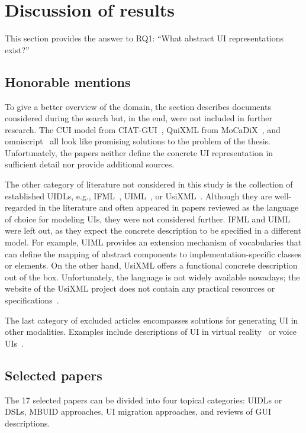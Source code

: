 \section{Discussion of results}\label{sec:review-discussion-of-results}

This section provides the answer to RQ1: \enquote{What abstract UI representations exist?}
\subsection{Honorable mentions}\label{subsec:honorable-mentions}
To give a better overview of the domain, the section describes documents considered during the search but, in the end, were not included in further research.
The CUI model from CIAT-GUI~\cite{Molina2012-my}, QuiXML from MoCaDiX~\cite{Vanderdonckt2019-av}, and omniscript~\cite{Ulusoy2019-jh} all look like promising solutions to the problem of the thesis.
Unfortunately, the papers neither define the concrete UI representation in sufficient detail nor provide additional sources.

The other category of literature not considered in this study is the collection of established UIDLs, e.g., IFML~\cite{Brambilla2014-ln}, UIML~\cite{Abrams1999}, or UsiXML~\cite{Limbourg2005}.
Although they are well-regarded in the literature and often appeared in papers reviewed as the language of choice for modeling UIs, they were not considered further.
IFML and UIML were left out, as they expect the concrete description to be specified in a different model.
For example, UIML provides an extension mechanism of vocabularies that can define the mapping of abstract components to implementation-specific classes or elements.
On the other hand, UsiXML offers a functional concrete description out of the box.
Unfortunately, the language is not widely available nowadays;
the website of the UsiXML project does not contain any practical resources or specifications~.

The last category of excluded articles encompasses solutions for generating UI in other modalities.
Examples include descriptions of UI in virtual reality~\cite{Olmedo2015} or voice UIs~\cite{steinberger2020domain}.

\subsection{Selected papers}\label{subsec:selected-papers}

The 17 selected papers can be divided into four topical categories: UIDLs or DSLs, MBUID approaches, UI migration approaches, and reviews of GUI descriptions.

